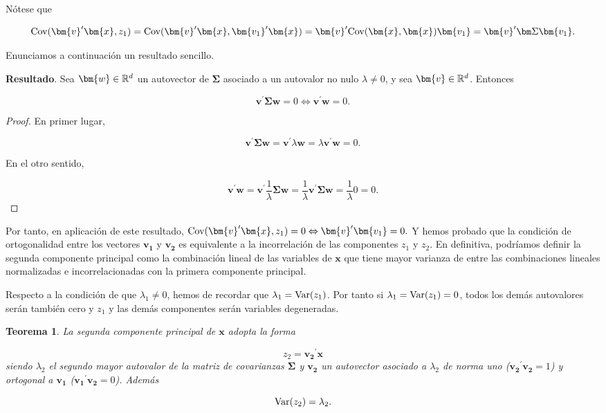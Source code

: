 \documentclass[
  a4paper,
  oneside]{scrbook}
\newtheorem{theorem}{Teorema}[chapter]
\theoremstyle{definition}
\theoremstyle{definition}
\theoremstyle{definition}
\theoremstyle{definition}
\theoremstyle{remark}
\begin{document}
Nótese que

\[\textnormal{Cov}(\bm{v}^{\prime}\bm{x},z_1)=\textnormal{Cov}(\bm{v}^{\prime}\bm{x}, \bm{v_1}^{\prime}\bm{x})=\bm{v}^{\prime}\textnormal{Cov}(\bm{x},\bm{x})\bm{v_1}=\bm{v}^{\prime}\bm\Sigma \bm{v_1}.\]

Enunciamos a continuación un resultado sencillo.

\textbf{Resultado}. Sea \(\bm{w}\in {\Bbb R}^d\) un autovector de \(\bm\Sigma\)
asociado a un autovalor no nulo \(\lambda\neq 0\), y sea
\(\bm{v}\in {\Bbb R}^d\). Entonces

\[\bm{v}^{\prime} \bm\Sigma \bm{w}=0 \Leftrightarrow \bm{v}^{\prime} \bm{w}=0.\]

\begin{proof}
En primer lugar,

\[\bm{v}^{\prime}\bm\Sigma \bm{w}=\bm{v}^{\prime}\lambda \bm{w}=\lambda \bm{v}^{\prime} \bm{w}=0.\]

En el otro sentido,

\[\bm{v}^{\prime} \bm{w}=\bm{v}^{\prime}\frac{1}{\lambda}\bm\Sigma \bm{w}=\frac{1}{\lambda} \bm{v}^{\prime}\bm\Sigma \bm{w}
=\frac{1}{\lambda}0=0.\]
\end{proof}

Por tanto, en aplicación de este resultado, \(\textnormal{Cov}(\bm{v}^{\prime}\bm{x},z_1)=0 \Leftrightarrow \bm{v}^{\prime} \bm{v_1}=0.\) Y hemos probado que la condición de ortogonalidad entre los vectores
\(\bm{v_1}\) y \(\bm{v_2}\) es equivalente a la incorrelación de las
componentes \(z_1\) y \(z_2\). En definitiva, podríamos definir la segunda
componente principal como la combinación lineal de las variables de
\(\bm{x}\) que tiene mayor varianza de entre las combinaciones lineales
normalizadas e incorrelacionadas con la primera componente principal.

Respecto a la condición de que \(\lambda_1\neq 0\), hemos de recordar que
\(\lambda_1=\textnormal{Var}(z_1)\). Por tanto si
\(\lambda_1=\textnormal{Var}(z_1)=0\), todos los demás autovalores serán
también cero y \(z_1\) y las demás componentes serán variables
degeneradas.

\begin{theorem}
\protect\hypertarget{thm:unnamed-chunk-75}{}\label{thm:unnamed-chunk-75}La segunda componente principal de \(\bm{x}\) adopta la forma

\[z_2=\bm{v_2}^{\prime}\bm{x}\] siendo \(\lambda_2\) el segundo mayor
autovalor de la matriz de covarianzas \(\bm\Sigma\) y \(\bm{v_2}\) un
autovector asociado a \(\lambda_2\) de norma uno
(\(\bm{v_2}^{\prime}\bm{v_2}=1\)) y ortogonal a \(\bm{v_1}\)
(\(\bm{v_1}^{\prime}\bm{v_2}=0\)). Además

\[\textnormal{Var}(z_2)=\lambda_2.\]
\end{theorem}
\end{document}
